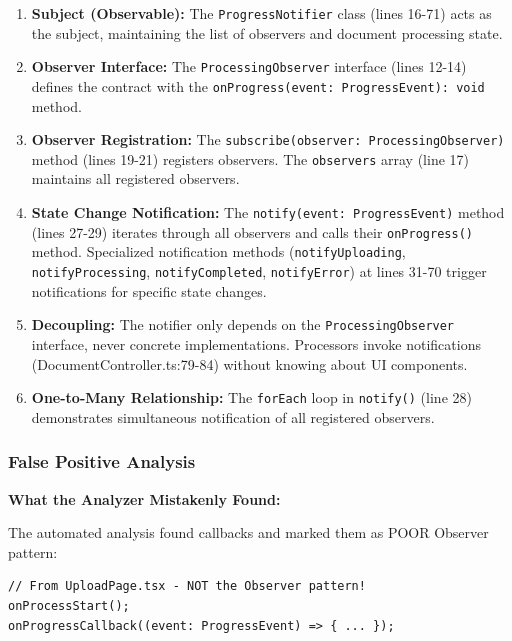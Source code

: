 \documentclass[11pt]{article}
\begin{document}
\begin{enumerate}[noitemsep]
    \item \textbf{Subject (Observable):} The \texttt{ProgressNotifier} class (lines 16-71) acts as the subject, maintaining the list of observers and document processing state.

    \item \textbf{Observer Interface:} The \texttt{ProcessingObserver} interface (lines 12-14) defines the contract with the \texttt{onProgress(event: ProgressEvent): void} method.

    \item \textbf{Observer Registration:} The \texttt{subscribe(observer: ProcessingObserver)} method (lines 19-21) registers observers. The \texttt{observers} array (line 17) maintains all registered observers.

    \item \textbf{State Change Notification:} The \texttt{notify(event: ProgressEvent)} method (lines 27-29) iterates through all observers and calls their \texttt{onProgress()} method. Specialized notification methods (\texttt{notifyUploading}, \texttt{notifyProcessing}, \texttt{notifyCompleted}, \texttt{notifyError}) at lines 31-70 trigger notifications for specific state changes.

    \item \textbf{Decoupling:} The notifier only depends on the \texttt{ProcessingObserver} interface, never concrete implementations. Processors invoke notifications (DocumentController.ts:79-84) without knowing about UI components.

    \item \textbf{One-to-Many Relationship:} The \texttt{forEach} loop in \texttt{notify()} (line 28) demonstrates simultaneous notification of all registered observers.
\end{enumerate}

\subsubsection{False Positive Analysis}
\textbf{What the Analyzer Mistakenly Found:}

The automated analysis found callbacks and marked them as POOR Observer pattern:
\begin{verbatim}
// From UploadPage.tsx - NOT the Observer pattern!
onProcessStart();
onProgressCallback((event: ProgressEvent) => { ... });
\end{verbatim}
\end{document}
